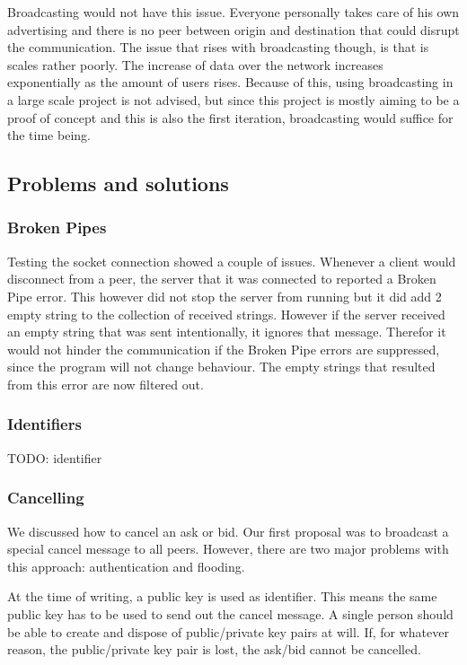 \documentclass[]{article}
\begin{document}
Broadcasting would not have this issue. Everyone personally takes care of his own advertising and there is no peer between origin and destination that could disrupt the communication. The issue that rises with broadcasting though, is that is scales rather poorly. The increase of data over the network increases exponentially as the amount of users rises. Because of this, using broadcasting in a large scale project is not advised, but since this project is mostly aiming to be a proof of concept and this is also the first iteration, broadcasting would suffice for the time being.

\subsection{Problems and solutions}
\subsubsection{Broken Pipes}
Testing the socket connection showed a couple of issues. Whenever a client would disconnect from a peer, the server that it was connected to reported a Broken Pipe error. This however did not stop the server from running but it did add 2 empty string to the collection of received strings. However if the server received an empty string that was sent intentionally, it ignores that message. Therefor it would not hinder the communication if the Broken Pipe errors are suppressed, since the program will not change behaviour. The empty strings that resulted from this error are now filtered out.

\subsubsection{Identifiers}
TODO: identifier

\subsubsection{Cancelling}
We discussed how to cancel an ask or bid. Our first proposal was to broadcast a special cancel message to all peers. However, there are two major problems with this approach: authentication and flooding.

At the time of writing, a public key is used as identifier. This means the same public key has to be used to send out the cancel message. A single person should be able to create and dispose of public/private key pairs at will. If, for whatever reason, the public/private key pair is lost, the ask/bid cannot be cancelled.
\end{document}
